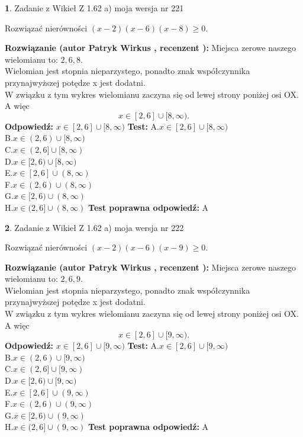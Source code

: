 \documentclass[12pt, a4paper]{article}
\theoremstyle{definition} %
\newtheorem{zad}{}
\newcommand{\zadStart}[1]{\begin{zad}#1\newline}
\newcommand{\zadStop}{\end{zad}}
\newcommand{\rozwStart}[2]{\noindent \textbf{Rozwiązanie (autor #1 , recenzent #2): }\newline}
\newcommand{\rozwStop}{\newline}
\newcommand{\odpStart}{\noindent \textbf{Odpowiedź:}\newline}
\newcommand{\odpStop}{\newline}
\newcommand{\testStart}{\noindent \textbf{Test:}\newline}
\newcommand{\testStop}{\newline}
\newcommand{\kluczStart}{\noindent \textbf{Test poprawna odpowiedź:}\newline}
\newcommand{\kluczStop}{\newline}
\begin{document}
\zadStart{Zadanie z Wikieł Z 1.62 a) moja wersja nr 221}

Rozwiązać nierówności $(x-2)(x-6)(x-8)\ge0$.
\zadStop
\rozwStart{Patryk Wirkus}{}
Miejsca zerowe naszego wielomianu to: $2, 6, 8$.\\
Wielomian jest stopnia nieparzystego, ponadto znak współczynnika przy\linebreak najwyższej potędze x jest dodatni.\\ W związku z tym wykres wielomianu zaczyna się od lewej strony poniżej osi OX. A więc $$x \in [2,6] \cup [8,\infty).$$
\rozwStop
\odpStart
$x \in [2,6] \cup [8,\infty)$
\odpStop
\testStart
A.$x \in [2,6] \cup [8,\infty)$\\
B.$x \in (2,6) \cup [8,\infty)$\\
C.$x \in (2,6] \cup [8,\infty)$\\
D.$x \in [2,6) \cup [8,\infty)$\\
E.$x \in [2,6] \cup (8,\infty)$\\
F.$x \in (2,6) \cup (8,\infty)$\\
G.$x \in [2,6) \cup (8,\infty)$\\
H.$x \in (2,6] \cup (8,\infty)$
\testStop
\kluczStart
A
\kluczStop



\zadStart{Zadanie z Wikieł Z 1.62 a) moja wersja nr 222}

Rozwiązać nierówności $(x-2)(x-6)(x-9)\ge0$.
\zadStop
\rozwStart{Patryk Wirkus}{}
Miejsca zerowe naszego wielomianu to: $2, 6, 9$.\\
Wielomian jest stopnia nieparzystego, ponadto znak współczynnika przy\linebreak najwyższej potędze x jest dodatni.\\ W związku z tym wykres wielomianu zaczyna się od lewej strony poniżej osi OX. A więc $$x \in [2,6] \cup [9,\infty).$$
\rozwStop
\odpStart
$x \in [2,6] \cup [9,\infty)$
\odpStop
\testStart
A.$x \in [2,6] \cup [9,\infty)$\\
B.$x \in (2,6) \cup [9,\infty)$\\
C.$x \in (2,6] \cup [9,\infty)$\\
D.$x \in [2,6) \cup [9,\infty)$\\
E.$x \in [2,6] \cup (9,\infty)$\\
F.$x \in (2,6) \cup (9,\infty)$\\
G.$x \in [2,6) \cup (9,\infty)$\\
H.$x \in (2,6] \cup (9,\infty)$
\testStop
\kluczStart
A
\kluczStop
\end{document}
